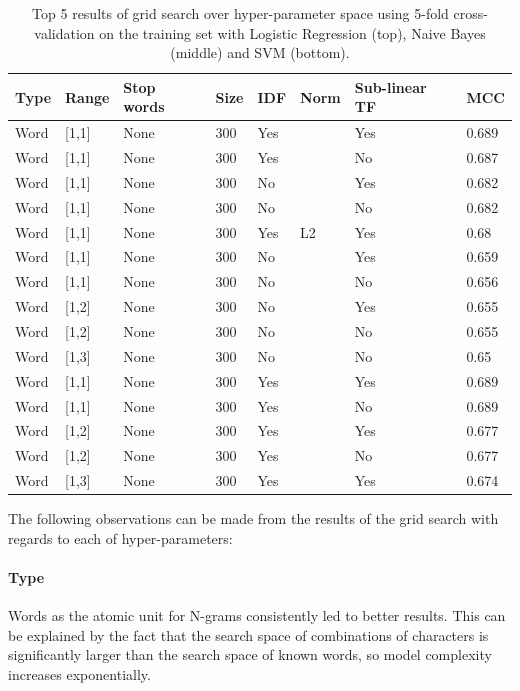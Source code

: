 \begin{table}[h]
  \begin{center}
  \begin{tabular}{ l l l l l l l l }
    \toprule
    Type & Range & Stop words & Size & IDF & Norm & Sub-linear TF & \gls{MCC} \\
    \midrule
    Word & [1,1] & None & 300 & Yes &  & Yes & 0.689 \\
    Word & [1,1] & None & 300 & Yes &  & No & 0.687 \\
    Word & [1,1] & None & 300 & No &  & Yes & 0.682 \\
    Word & [1,1] & None & 300 & No &  & No & 0.682 \\
    Word & [1,1] & None & 300 & Yes & L2 & Yes & 0.68 \\
    \midrule
    Word & [1,1] & None & 300 & No & & Yes & 0.659  \\
    Word & [1,1] & None & 300 & No & & No & 0.656 \\
    Word & [1,2] & None & 300 & No & & Yes & 0.655 \\
    Word & [1,2] & None & 300 & No & & No & 0.655 \\
    Word & [1,3] & None & 300 & No & & No & 0.65 \\
    \midrule
    Word & [1,1] & None & 300 & Yes & & Yes & 0.689 \\
    Word & [1,1] & None & 300 & Yes & & No  & 0.689 \\
    Word & [1,2] & None & 300 & Yes & & Yes & 0.677 \\
    Word & [1,2] & None & 300 & Yes & & No  & 0.677 \\
    Word & [1,3] & None & 300 & Yes & & Yes & 0.674 \\
    \bottomrule
  \end{tabular}
  \caption{Top 5 results of grid search over hyper-parameter space using 5-fold cross-validation on the training set with Logistic Regression (top), Naive Bayes (middle) and SVM (bottom).}
\label{tab:Ngram Grid Search}
\end{center}
\end{table}

The following observations can be made from the results of the grid search with regards to each of hyper-parameters:


\paragraph{Type}
\label{par:Type}
Words as the atomic unit for N-grams consistently led to better results. This can be explained by the fact that the search space of combinations of characters is significantly larger than the search space of known words, so model complexity increases exponentially.

